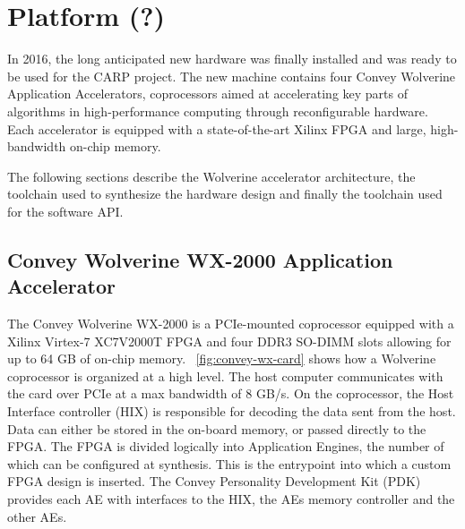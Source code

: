 
\chapter{Platform (?)}
\label{chp:platform}

In 2016, the long anticipated new hardware was finally installed and was ready
to be used for the CARP project. The new machine contains four Convey Wolverine
Application Accelerators, coprocessors aimed at accelerating key parts of
algorithms in high-performance computing through reconfigurable hardware. Each
accelerator is equipped with a state-of-the-art Xilinx FPGA and large,
high-bandwidth on-chip memory.

The following sections describe the Wolverine accelerator architecture, the
toolchain used to synthesize the hardware design and finally the toolchain used
for the software API.

\section{Convey Wolverine WX-2000 Application Accelerator}
\label{sec:coproc}

The Convey Wolverine WX-2000 is a PCIe-mounted coprocessor equipped with a
Xilinx Virtex-7 XC7V2000T FPGA and four DDR3 SO-DIMM slots allowing for up to 64
GB of on-chip memory. \figurename~\ref{fig:convey-wx-card} shows how a Wolverine
coprocessor is organized at a high level. The host computer communicates with
the card over PCIe at a max bandwidth of 8 GB/s. On the coprocessor, the Host
Interface controller (HIX) is responsible for decoding the data sent from the
host. Data can either be stored in the on-board memory, or passed directly to
the FPGA. The FPGA is divided logically into Application Engines, the number of
which can be configured at synthesis. This is the entrypoint into which a custom
FPGA design is inserted. The Convey Personality Development Kit (PDK) provides
each AE with interfaces to the HIX, the AEs memory controller and the other AEs.


